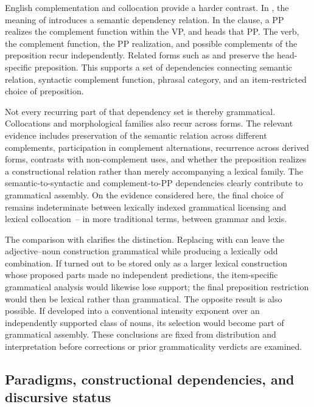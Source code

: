 \documentclass[12pt,letterpaper]{article}
\begin{document}
English complementation and collocation provide a harder contrast. In
, the meaning of  introduces a
semantic dependency relation. In the clause, a PP realizes the complement function
within the VP, and  heads that PP. The verb, the complement function,
the PP realization, and possible complements of the preposition recur
independently. Related forms such as  and
 preserve the head-specific preposition. This supports a
set of dependencies connecting semantic relation, syntactic complement function,
phrasal category, and an item-restricted choice of preposition.

Not every recurring part of that dependency set is thereby grammatical. Collocations and
morphological families also recur across forms. The relevant evidence includes
preservation of the semantic relation across different complements,
participation in complement alternations, recurrence across derived forms,
contrasts with non-complement uses, and whether the preposition realizes a
constructional relation rather than merely accompanying a lexical family. The
semantic-to-syntactic and complement-to-PP dependencies clearly contribute to
grammatical assembly. On the
evidence considered here, the final choice of  remains indeterminate
between lexically indexed grammatical licensing and lexical collocation~-- in more
traditional terms, between grammar and lexis.

The comparison with  clarifies the distinction. Replacing
 with  can leave the adjective--noun construction
grammatical while producing a lexically odd combination. If 
turned out to be stored only as a larger lexical construction whose proposed
parts made no independent predictions, the item-specific grammatical analysis
would likewise lose support; the final preposition restriction would then be
lexical rather than grammatical. The opposite result is also possible. If
 developed into a conventional intensity exponent
over an independently supported class of nouns, its selection would become part
of grammatical assembly. These conclusions are fixed from distribution and interpretation
before corrections or prior grammaticality verdicts are examined.

\subsection{Paradigms, constructional dependencies, and discursive status}
\end{document}
